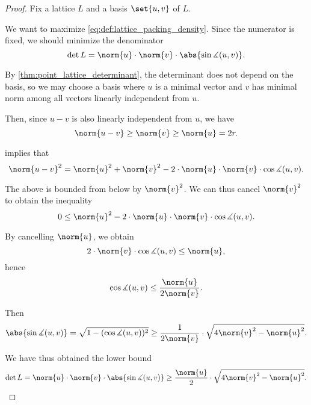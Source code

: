 \begin{proof}
  Fix a lattice \( L \) and a basis \( \set{ u, v } \) of \( L \).

  We want to maximize \eqref{eq:def:lattice_packing_density}. Since the numerator is fixed, we should minimize the denominator
  \begin{equation*}
    \det L = \norm{u} \cdot \norm{v} \cdot \abs{\sin\measuredangle(u, v)}.
  \end{equation*}

  By \cref{thm:point_lattice_determinant}, the determinant does not depend on the basis, so we may choose a basis where \( u \) is a minimal vector and \( v \) has minimal norm among all vectors linearly independent from \( u \).

  Then, since \( u - v \) is also linearly independent from \( u \), we have
  \begin{equation*}
    \norm{u - v} \geq \norm{v} \geq \norm{u} = 2r.
  \end{equation*}

   implies that
  \begin{equation*}
    \norm{u - v}^2 = \norm{u}^2 + \norm{v}^2 - 2 \cdot \norm{u} \cdot \norm{v} \cdot \cos \measuredangle(u, v).
  \end{equation*}

  The above is bounded from below by \( \norm{v}^2 \). We can thus cancel \( \norm{v}^2 \) to obtain the inequality
  \begin{equation*}
    0 \leq \norm{u}^2 - 2 \cdot \norm{u} \cdot \norm{v} \cdot \cos \measuredangle(u, v).
  \end{equation*}

  By cancelling \( \norm{u} \), we obtain
  \begin{equation*}
    2 \cdot \norm{v} \cdot \cos \measuredangle(u, v) \leq \norm{u},
  \end{equation*}
  hence
  \begin{equation*}
    \cos \measuredangle(u, v) \leq \frac {\norm{u}} {2\norm{v}}.
  \end{equation*}

  Then
  \begin{equation*}
    \abs{\sin \measuredangle(u, v)}
    =
    \sqrt{ 1 - (\cos \measuredangle(u, v))^2 }
    \geq
    \frac 1 {2\norm{v}} \cdot \sqrt{ 4\norm{v}^2 - \norm{u}^2 }.
  \end{equation*}

  We have thus obtained the lower bound
  \begin{equation*}
    \det L = \norm{u} \cdot \norm{v} \cdot \abs{\sin\measuredangle(u, v)} \geq \frac {\norm {u}} 2 \cdot \sqrt{ 4\norm{v}^2- \norm{u}^2 }.
  \end{equation*}


\end{proof}
